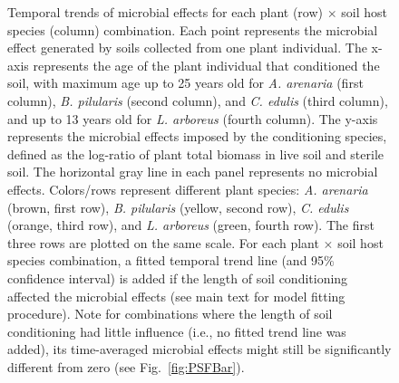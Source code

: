 \newpage
\begin{figure}[h]
	\centering
	\caption[Temporal trends of microbial effects for each plant $\times$ soil host species combination.]
		{\hspace{1mm} 
		Temporal trends of microbial effects for each plant (row) $\times$ soil host species (column) combination.
		Each point represents the microbial effect generated by soils collected from one plant individual.
		The x-axis represents the age of the plant individual that conditioned the soil, with maximum age up to 25 years old for \textit{A. arenaria} (first column), \textit{B. pilularis} (second column), and \textit{C. edulis} (third column), and up to 13 years old for \textit{L. arboreus} (fourth column). The y-axis represents the microbial effects imposed by the conditioning species, defined as the log-ratio of plant total biomass in live soil and sterile soil. The horizontal gray line in each panel represents no microbial effects.
		Colors/rows represent different plant species: \textit{A. arenaria} (brown, first row), \textit{B. pilularis} (yellow, second row), \textit{C. edulis} (orange, third row), and \textit{L. arboreus} (green, fourth row). The first three rows are plotted on the same scale.
		For each plant $\times$ soil host species combination, a fitted temporal trend line (and 95$\%$ confidence interval) is added if the length of soil conditioning affected the microbial effects (see main text for model fitting procedure).
		Note for combinations where the length of soil conditioning had little influence (i.e., no fitted trend line was added), its time-averaged microbial effects might still be significantly different from zero (see Fig.~\ref{fig:PSFBar}).}
	\label{fig:PSFTemporal}
\end{figure}



